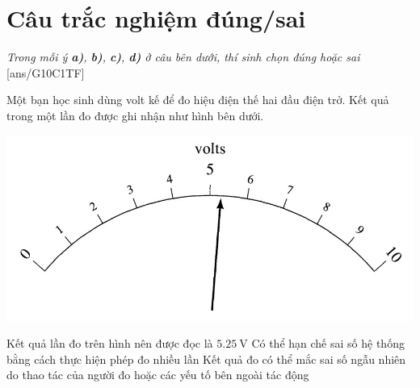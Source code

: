 \section{Câu trắc nghiệm đúng/sai} 
\textit{Trong mỗi ý \textbf{a)}, \textbf{b)}, \textbf{c)}, \textbf{d)} ở câu bên dưới, thí sinh chọn đúng hoặc sai}
\setcounter{ex}{0}
[ans/G10C1TF]
\begin{ex}
Một bạn học sinh dùng volt kế để đo hiệu điện thế hai đầu điện trở. Kết quả trong một lần đo được ghi nhận như hình bên dưới.
\begin{center}
	\includegraphics[width=0.6\linewidth]{figs/G10-CHUONG1-2}
\end{center}
	{Kết quả lần đo trên hình nên được đọc là $\SI{5.25}{\volt}$}
	{Có thể hạn chế sai số hệ thống bằng cách thực hiện phép đo nhiều lần}
	{\True Kết quả đo có thể mắc sai số ngẫu nhiên do thao tác của người đo hoặc các yếu tố bên ngoài tác động}
\end{ex}

